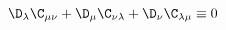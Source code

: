 \begin{equation}
\label{e5:37}
\D_{\lambda}\C_{\mu \nu}+\D_{\mu}\C_{\nu \lambda}+\D_{\nu}\C_{\lambda \mu} \equiv 0
\end{equation} 
